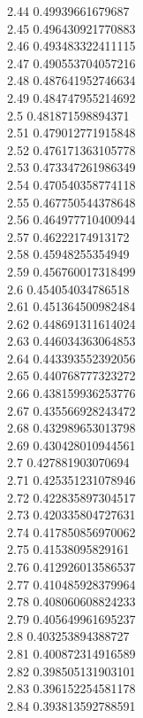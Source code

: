 {2.44	0.49939661679687\\
2.45	0.496430921770883\\
2.46	0.493483322411115\\
2.47	0.490553704057216\\
2.48	0.487641952746634\\
2.49	0.484747955214692\\
2.5	0.481871598894371\\
2.51	0.479012771915848\\
2.52	0.476171363105778\\
2.53	0.473347261986349\\
2.54	0.470540358774118\\
2.55	0.467750544378648\\
2.56	0.464977710400944\\
2.57	0.46222174913172\\
2.58	0.45948255354949\\
2.59	0.456760017318499\\
2.6	0.454054034786518\\
2.61	0.451364500982484\\
2.62	0.448691311614024\\
2.63	0.446034363064853\\
2.64	0.443393552392056\\
2.65	0.440768777323272\\
2.66	0.438159936253776\\
2.67	0.435566928243472\\
2.68	0.432989653013798\\
2.69	0.430428010944561\\
2.7	0.427881903070694\\
2.71	0.425351231078946\\
2.72	0.422835897304517\\
2.73	0.420335804727631\\
2.74	0.417850856970062\\
2.75	0.41538095829161\\
2.76	0.412926013586537\\
2.77	0.410485928379964\\
2.78	0.408060608824233\\
2.79	0.405649961695237\\
2.8	0.403253894388727\\
2.81	0.400872314916589\\
2.82	0.398505131903101\\
2.83	0.396152254581178\\
2.84	0.393813592788591\\
}
